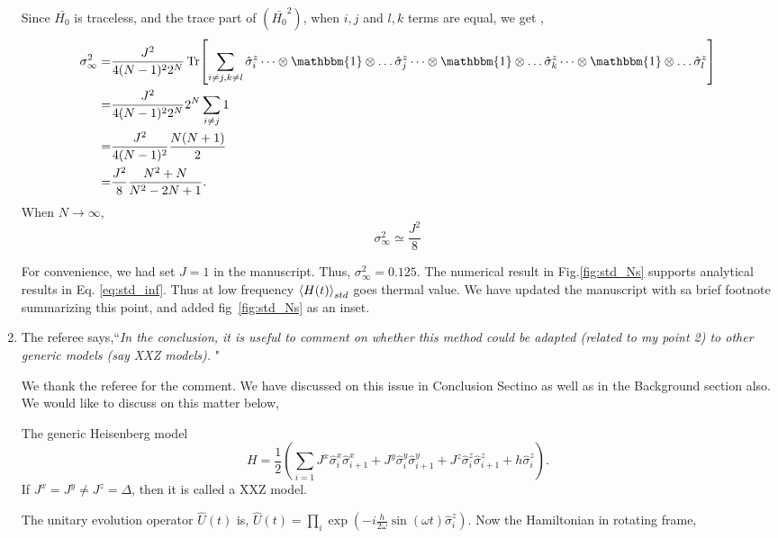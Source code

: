 \documentclass[aps,prb,reprint,showpacs,floatfix,superscriptaddress, onecolumn, nofootinbib, 9pt]{revtex4-2}
\newcommand{\response}[1]{{\color{blue}#1}} %
\begin{document}
\begin{enumerate}
{			Since $\bar{H_0}$ is traceless, and the trace part of $\left(\bar{H_0}^2\right)$, when $i,j$ and $l,k$ terms are equal, we get ,
			\begin{align*}
				\sigma_\infty^2 =& \frac{J^2}{4(N-1)^2 2^N}\Tr[\sum_{i\neq j, k \neq l} \hat{\sigma}^z_i \dots\otimes \mathbbm{1} \otimes \dots \hat{\sigma}^z_j \dots\otimes \mathbbm{1} \otimes \dots \hat{\sigma}^z_k\dots\otimes \mathbbm{1} \otimes \dots \hat{\sigma}^z_l ]\\
				=& \frac{J^2}{4(N-1)^2 2^N}   2^N \sum_{i\neq j} 1\\
				=& \frac{J^2}{4(N-1)^2} \frac{N(N+1)}{2}\\
				=& \frac{J^2}{8} \frac{N^2+N}{N^2-2N+1}.
			\end{align*}
			When $N\rightarrow \infty$,
			\begin{equation}
				\sigma_\infty^2 \simeq \frac{J^2}{8}
				\label{eq:std_inf}
			\end{equation} 
			
			For convenience, we had set $J=1$ in the manuscript. Thus, $\sigma_\infty^2 = 0.125$. The numerical result in Fig.\ref{fig:std_Ns} supports analytical results in Eq. \eqref{eq:std_inf}. Thus at low frequency $\expval{H(t)}_{std}$ goes thermal value. We have updated the manuscript with sa brief footnote summarizing this point, and added fig~\ref{fig:std_Ns} as an inset.
		}
		
		
		\vskip 2cm
		\item The referee says,``\textit{In the conclusion, it is useful to comment on whether this method could be adapted (related to my point 2) to other generic models (say
			XXZ models). }"\\
		
		\response{
		We thank the referee for the comment. We have discussed on this issue in Conclusion Sectino as well as in the Background section also.
		We would like to discuss on this matter below, 

		The generic Heisenberg model
			\begin{equation*}
				H = \frac12 \left( \sum_{i=1} J^x \hat{\sigma}^x_i \hat{\sigma}^x_{i+1} +J^y  \hat{\sigma}^y_i \hat{\sigma}^y_{i+1} + J^z  \hat{\sigma}^z_i \hat{\sigma}^z_{i+1} + h  \hat{\sigma}^z_i\right).
			\end{equation*}
			If $J^x= J^y \neq J^z=\Delta$, then it is called a XXZ model.
			
			The unitary evolution operator $\displaystyle \hat{U}(t)$ is, $\hat{U}(t)=\prod_{i} \exp \left(-i \frac{h}{2 \omega} \sin (\omega t) \hat{\sigma}_{i}^{z}\right)$. Now the Hamiltonian in rotating frame,
			
}
\end{enumerate}
\end{document}
